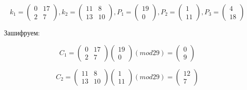 \documentclass[a4paper]{article}
\begin{document}
\[
    k_1=
    \begin{pmatrix}
        0 & 17 \\
        2 & 7
    \end{pmatrix},
    k_2=
    \begin{pmatrix}
        11 & 8 \\
        13 & 10
    \end{pmatrix},
    P_1=
    \begin{pmatrix}
        19 \\
        0
    \end{pmatrix},
    P_2=
    \begin{pmatrix}
        1 \\
        11
    \end{pmatrix},
    P_3=
    \begin{pmatrix}
        4 \\
        18
    \end{pmatrix}
\]

Зашифруем:

\[
    C_1=
    \begin{pmatrix}
        0 & 17 \\
        2 & 7
    \end{pmatrix}
    \begin{pmatrix}
        19 \\
        0
    \end{pmatrix}
    (mod 29) =
    \begin{pmatrix}
        0 \\
        9
    \end{pmatrix}
\]

\[
    C_2=
    \begin{pmatrix}
        11 & 8 \\
        13 & 10
    \end{pmatrix}
    \begin{pmatrix}
        1 \\
        11
    \end{pmatrix}
    (mod 29) =
    \begin{pmatrix}
        12 \\
        7
    \end{pmatrix}
\]
\end{document}
